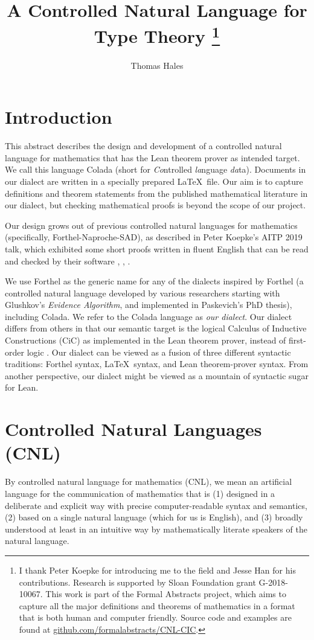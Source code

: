 \documentclass{easychair}
\title{A Controlled Natural Language for Type Theory%
  \thanks{I thank
  Peter Koepke for introducing me to the field and Jesse Han for his
  contributions.  Research is supported by Sloan Foundation grant
  G-2018-10067.  This work is part of the Formal Abstracts project,
  which aims to capture all the major definitions and theorems of
  mathematics in a format that is both human and computer friendly.
  Source code and examples are found at
  \url{github.com/formalabstracts/CNL-CIC}.}  }
\author{Thomas Hales}
\institute{
University of Pittsburgh\\
Pittsburgh, PA, USA
}
\renewcommand{\~}{\ }
\renewcommand{\_}{\textunderscore}
\begin{document}
\maketitle

\section{Introduction}

This abstract describes the design and development of a controlled
natural language for mathematics that has the Lean theorem prover as
intended target.  We call this language Colada (short for
\emph{Co}ntrolled \emph{la}nguage \emph{da}ta).  Documents in our
dialect are written in a specially prepared \LaTeX\ file.  Our aim is
to capture definitions and theorem statements from the published
mathematical literature in our dialect, but checking mathematical
proofs is beyond the scope of our project.

Our design grows out of previous controlled natural languages for
mathematics (specifically, Forthel-Naproche-SAD), as described in
Peter Koepke's AITP 2019 talk, which exhibited some short proofs
written in fluent English that can be read and checked by their
software \cite{frerix2019making}, \cite{paskevich2007syntax},
\cite{lyaletski2004theorem}.

We use Forthel as the generic name for any of the dialects inspired by
Forthel (a controlled natural language developed by various
researchers starting with Glushkov's \emph{Evidence Algorithm}, and
implemented in Paskevich's PhD thesis), including Colada.  We refer to
the Colada language as \emph{our dialect}.  Our dialect differs from
others in that our semantic target is the logical Calculus of
Inductive Constructions (CiC) as implemented in the Lean theorem
prover, instead of first-order logic \cite{de2015lean}.  Our dialect
can be viewed as a fusion of three different syntactic traditions:
Forthel syntax, \LaTeX\ syntax, and Lean theorem-prover syntax.  From
another perspective, our dialect might be viewed as a mountain of
syntactic sugar for Lean.

\section{Controlled Natural Languages (CNL)}\label{sub:CNL}

By controlled natural language for mathematics (CNL), we mean an
artificial language for the communication of mathematics that is (1)
designed in a deliberate and explicit way with precise
computer-readable syntax and semantics, (2) based on a single natural
language (which for us is English), and (3) broadly understood at
least in an intuitive way by mathematically literate speakers of the
natural language.
\end{document}
